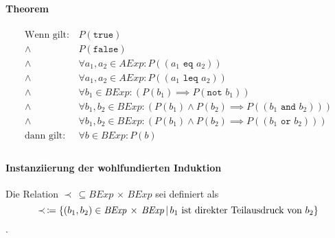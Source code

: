 			    \paragraph{Theorem}
				    \begin{align*}
					    \text{Wenn gilt:} & \,P(\texttt{true}) \\
					    \land & \,P(\texttt{false}) \\
					    \land & \,\forall a _ 1, a _ 2 \in \textit{AExp} : P((a _ 1 \texttt{ eq } a _ 2)) \\
					    \land & \,\forall a _ 1, a _ 2 \in \textit{AExp} : P((a _ 1 \texttt{ leq } a _ 2)) \\
					    \land & \,\forall b _ 1 \in \textit{BExp} : (P(b _ 1) \implies P(\texttt{not } b _ 1)) \\
					    \land & \,\forall b _ 1, b _ 2 \in \textit{BExp} : (P(b _ 1) \land P(b _ 2) \implies P((b _ 1 \texttt{ and } b _ 2))) \\
					    \land & \,\forall b _ 1, b _ 2 \in \textit{BExp} : (P(b _ 1) \land P(b _ 2) \implies P((b _ 1 \texttt{ or } b _ 2))) \\
					    \text{dann gilt:} & \,\forall b \in \textit{BExp} : P(b) \\
				    \end{align*}
		    
			    \paragraph{Instanziierung der wohlfundierten Induktion}
				    
				    Die Relation $ \prec \,\subseteq \textit{BExp} \,\times\, \textit{BExp} $ sei definiert als \[ \prec \,\coloneqq \{ (b _ 1, b _ 2) \in \textit{BExp} \,\times\, \textit{BExp} \,\vert\, b _ 1 \text{ ist direkter Teilausdruck von } b _ 2 \} \].
				    
